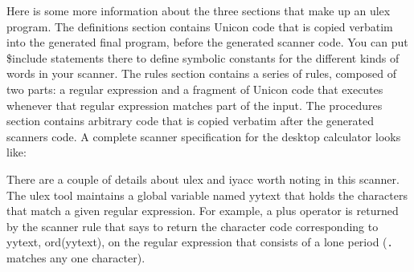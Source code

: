 \iconcode{
[a-zA-Z\_][a-zA-Z0-9\_]*}

Here is some more information about the three sections that make up an
\textsf{ulex} program. The definitions section contains Unicon code
that is copied verbatim into the generated final program, before the
generated scanner code. You can put \textsf{\$include} statements there
to define symbolic constants for the different kinds of words in your
scanner. The rules section contains a series of rules, composed of two
parts: a regular expression and a fragment of Unicon code that executes
whenever that regular expression matches part of the input. The
procedures section contains arbitrary code that is copied verbatim
after the generated scanner{\textquotesingle}s code. A complete scanner
specification for the desktop calculator looks like:


There are a couple of details about \textsf{ulex} and \textsf{iyacc}
worth noting in this scanner. The \textsf{ulex} tool maintains a global
variable named \textsf{yytext} that holds the characters that match a
given regular expression. For example, a plus operator is returned by
the scanner rule that says to return the character code corresponding
to \textsf{yytext}, \textsf{ord(yytext)}, on the regular expression
that consists of a lone period (\texttt{.} matches any one character).


